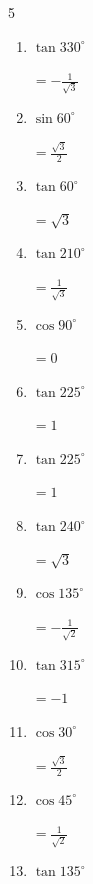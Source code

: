 \begin{multicols}{5}
\begin{enumerate}
        $\displaystyle =1$

  \item $\displaystyle \tan{330^\circ}$

        $\displaystyle =-\frac{1}{\sqrt{3}}$

  \item $\displaystyle \sin{60^\circ}$

        $\displaystyle =\frac{\sqrt{3}}{2}$

  \item $\displaystyle \tan{60^\circ}$

        $\displaystyle =\sqrt{3}$

  \item $\displaystyle \tan{210^\circ}$

        $\displaystyle =\frac{1}{\sqrt{3}}$

  \item $\displaystyle \cos{90^\circ}$

        $\displaystyle =0$

  \item $\displaystyle \tan{225^\circ}$

        $\displaystyle =1$

  \item $\displaystyle \tan{225^\circ}$

        $\displaystyle =1$

  \item $\displaystyle \tan{240^\circ}$

        $\displaystyle =\sqrt{3}$

  \item $\displaystyle \cos{135^\circ}$

        $\displaystyle =-\frac{1}{\sqrt{2}}$

  \item $\displaystyle \tan{315^\circ}$

        $\displaystyle =-1$

\columnbreak %

\resetques

  \item $\displaystyle \cos{30^\circ}$

        $\displaystyle =\frac{\sqrt{3}}{2}$

  \item $\displaystyle \cos{45^\circ}$

        $\displaystyle =\frac{1}{\sqrt{2}}$

  \item $\displaystyle \tan{135^\circ}$


\end{enumerate}
\end{multicols}
